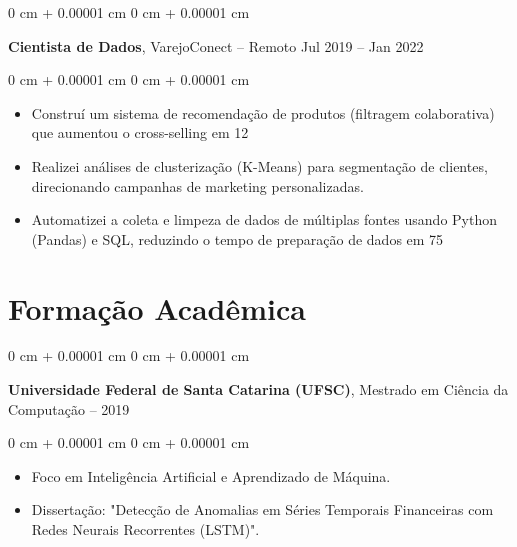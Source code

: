 \documentclass[10pt, letterpaper]{article}
\newenvironment{highlights}{
    \begin{itemize}[
        topsep=0.10 cm,
        parsep=0.10 cm,
        partopsep=0pt,
        itemsep=0pt,
        leftmargin=0 cm + 10pt
    ]
}{
    \end{itemize}
}
\newenvironment{onecolentry}{
    \begin{adjustwidth}{
        0 cm + 0.00001 cm
    }{
        0 cm + 0.00001 cm
    }
}{
    \end{adjustwidth}
}
\begin{document}
    \begin{onecolentry}
        \setcolumnwidth{\fill, 4.5cm}
        \begin{paracol}{2}
            \textbf{Cientista de Dados}, VarejoConect -- Remoto
            \switchcolumn
            \raggedleft Jul 2019 – Jan 2022
        \end{paracol}
    \end{onecolentry}
    \vspace{0.10cm}
    \begin{onecolentry}
        \begin{highlights}
                    \item Construí um sistema de recomendação de produtos (filtragem colaborativa) que aumentou o cross-selling em 12%
                \item Realizei análises de clusterização (K-Means) para segmentação de clientes, direcionando campanhas de marketing personalizadas.
                \item Automatizei a coleta e limpeza de dados de múltiplas fontes usando Python (Pandas) e SQL, reduzindo o tempo de preparação de dados em 75%
        \end{highlights}
    \end{onecolentry}
    
\section{Formação Acadêmica}

    \begin{onecolentry}
        \setcolumnwidth{\fill, 4.5cm}
        \begin{paracol}{2}
            \textbf{Universidade Federal de Santa Catarina (UFSC)}, Mestrado em Ciência da Computação
            \switchcolumn
             – 2019
        \end{paracol}
    \end{onecolentry}
    \vspace{0.10cm}
    \begin{onecolentry}
        \begin{highlights}
                    \item Foco em Inteligência Artificial e Aprendizado de Máquina.
                \item Dissertação: "Detecção de Anomalias em Séries Temporais Financeiras com Redes Neurais Recorrentes (LSTM)".
        \end{highlights}
    \end{onecolentry}
    
\end{document}
